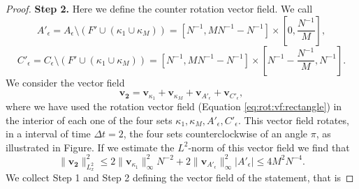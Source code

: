 \documentclass[12 pt]{article}
\theoremstyle{definition} \newtheorem{definition}{Definition}[section]
\theoremstyle{definition} \newtheorem{remark}[definition]{Remark}
\theoremstyle{plain} \newtheorem{lemma}[definition]{Lemma}
\theoremstyle{plain} \newtheorem{proposition}[definition]{Proposition}
\theoremstyle{plain} \newtheorem{theorem}[definition]{Theorem}
\theoremstyle{plain} \newtheorem{corollary}[definition]{Corollary}
\theoremstyle{definition} \newtheorem{example}[definition]{Example}
\theoremstyle{definition} \newtheorem{assumption}[definition]{Assumption}
\theoremstyle{definition} \newtheorem{conjecture}[definition]{Conjecture}
\newcommand{\1}{\mathbbm 1}
\numberwithin{equation}{section}
\begin{document}
\begin{appendix}
\begin{proof}
   \textbf{Step 2.} Here we define the counter rotation vector field. We call
   $$A'_\epsilon=A_\epsilon\setminus (F'\cup (\kappa_1\cup\kappa_M))=[N^{-1},MN^{-1}-N^{-1}]\times\left[0,\frac{N^{-1}}{M}\right],$$
   $$C'_\epsilon=C_\epsilon\setminus (F'\cup (\kappa_1\cup\kappa_M))=[N^{-1},MN^{-1}-N^{-1}]\times\left[N^{-1}-\frac{N^{-1}}{M},N^{-1}\right].$$
    We consider the vector field
   \begin{equation*}
       \mathbf{ v_2}= \mathbf{ v}_{\kappa_1}+\mathbf{ v}_{\kappa_M}+\mathbf{v}_{A'_\epsilon}+\mathbf{v}_{C'_\epsilon},
   \end{equation*}
   where we have used the rotation vector field (Equation \eqref{eq:rot:vf:rectangle}) in the interior of each one of the four sets $\kappa_1,\kappa_M,A'_\epsilon,C'_\epsilon.$ 
 This vector field rotates, in a interval of time $\Delta t=2$, the four sets counterclockwise of an angle $\pi$, as illustrated in Figure. If we estimate the $L^2$-norm of this vector field we find that
 \begin{equation*}
     \|\mathbf{v_2}\|^2_{L^2_x}\leq 2\|\mathbf v_{\kappa_1}\|^2_\infty N^{-2}+2\|\mathbf v_{A'_\epsilon}\|_\infty^2|A'_\epsilon|\leq 4M^2N^{-4}.
 \end{equation*}
 We collect Step 1 and Step 2 defining the vector field of the statement, that is


\end{proof}
\end{appendix}
\end{document}
